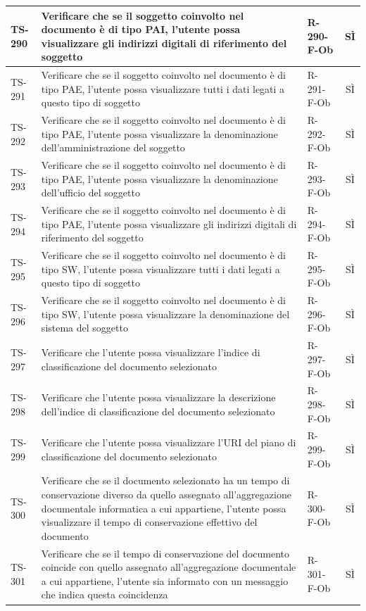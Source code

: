 \documentclass[a4paper,12pt]{article}
\begin{document}
\begin{longtable}{|p{1.5cm}|p{8.3cm}|p{2.4cm}|c|}
\hline
TS-290 & Verificare che se il soggetto coinvolto nel documento è di tipo PAI, l'utente possa visualizzare gli indirizzi digitali di riferimento del soggetto & R-290-F-Ob & SÌ \\
\hline
TS-291 & Verificare che se il soggetto coinvolto nel documento è di tipo PAE, l'utente possa visualizzare tutti i dati legati a questo tipo di soggetto & R-291-F-Ob & SÌ \\
\hline
TS-292 & Verificare che se il soggetto coinvolto nel documento è di tipo PAE, l'utente possa visualizzare la denominazione dell'amministrazione del soggetto & R-292-F-Ob & SÌ \\
\hline
TS-293 & Verificare che se il soggetto coinvolto nel documento è di tipo PAE, l'utente possa visualizzare la denominazione dell'ufficio del soggetto & R-293-F-Ob & SÌ \\
\hline
TS-294 & Verificare che se il soggetto coinvolto nel documento è di tipo PAE, l'utente possa visualizzare gli indirizzi digitali di riferimento del soggetto & R-294-F-Ob & SÌ \\
\hline
TS-295 & Verificare che se il soggetto coinvolto nel documento è di tipo SW, l'utente possa visualizzare tutti i dati legati a questo tipo di soggetto & R-295-F-Ob & SÌ \\
\hline
TS-296 & Verificare che se il soggetto coinvolto nel documento è di tipo SW, l'utente possa visualizzare la denominazione del sistema del soggetto & R-296-F-Ob & SÌ \\
\hline
TS-297 & Verificare che l'utente possa visualizzare l'indice di classificazione del documento selezionato & R-297-F-Ob & SÌ \\
\hline
TS-298 & Verificare che l'utente possa visualizzare la descrizione dell'indice di classificazione del documento selezionato & R-298-F-Ob & SÌ \\
\hline
TS-299 & Verificare che l'utente possa visualizzare l'URI del piano di classificazione del documento selezionato & R-299-F-Ob & SÌ \\
\hline
TS-300 & Verificare che se il documento selezionato ha un tempo di conservazione diverso da quello assegnato all'aggregazione documentale informatica a cui appartiene, l'utente possa visualizzare il tempo di conservazione effettivo del documento & R-300-F-Ob  & SÌ \\
\hline
TS-301 & Verificare che se il tempo di conservazione del documento coincide con quello assegnato all'aggregazione documentale a cui appartiene, l'utente sia informato con un messaggio che indica questa coincidenza & R-301-F-Ob & SÌ \\

\end{longtable}
\end{document}
